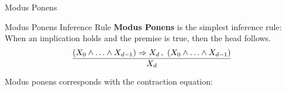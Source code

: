 \documentclass{beamer}
\begin{document}
    \begin{frame}{Modus Ponens}

        \begin{block}{Modus Ponens Inference Rule}
            {\bf Modus Ponens} is the simplest inference rule: When an implication holds and the premise is true, then the head follows.
            \begin{align*}
                \frac{
                    (X_{0}\land\ldots\land X_{d-1})\Rightarrow X_{d} \,,\,\, (X_{0}\land\ldots\land X_{d-1})
                }{
                    X_{d}
                }
            \end{align*}
        \end{block}
        Modus ponens corresponds with the contraction equation:
        \begin{center}
            
        \end{center}
    \end{frame}
\end{document}
